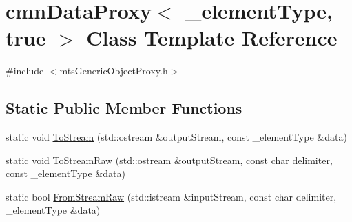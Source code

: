 \hypertarget{classcmn_data_proxy_3_01__element_type_00_01true_01_4}{\section{cmn\-Data\-Proxy$<$ \-\_\-element\-Type, true $>$ Class Template Reference}
\label{classcmn_data_proxy_3_01__element_type_00_01true_01_4}
}


{\ttfamily \#include $<$mts\-Generic\-Object\-Proxy.\-h$>$}

\subsection*{Static Public Member Functions}
\begin{DoxyCompactItemize}
\item 
static void \hyperlink{classcmn_data_proxy_3_01__element_type_00_01true_01_4_a610dc86e1b589200a2c0a6278c75509d}{To\-Stream} (std\-::ostream \&output\-Stream, const \-\_\-element\-Type \&data)
\item 
static void \hyperlink{classcmn_data_proxy_3_01__element_type_00_01true_01_4_a364315ac8a63feedf30b9c7ad032364a}{To\-Stream\-Raw} (std\-::ostream \&output\-Stream, const char delimiter, const \-\_\-element\-Type \&data)
\item 
static bool \hyperlink{classcmn_data_proxy_3_01__element_type_00_01true_01_4_ae2c7be42ef43e78e34d39e3dea3e5442}{From\-Stream\-Raw} (std\-::istream \&input\-Stream, const char delimiter, \-\_\-element\-Type \&data)
\end{DoxyCompactItemize}


